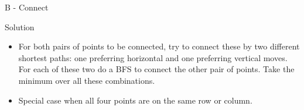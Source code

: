 \renewcommand{\insertshortauthor}{Problem Author: Jimmy M{\aa}rdell}
\begin{frame}{B - Connect}

\begin{block}{Solution}
  \begin{itemize}
    \item For both pairs of points to be connected, try to connect these by two different shortest paths: one preferring horizontal and one preferring vertical moves. For each of these two do a BFS to connect the other pair of points. Take the minimum over all these combinations. 
    \item Special case when all four points are on the same row or column. 
  \end{itemize}
\end{block}

\end{frame}
